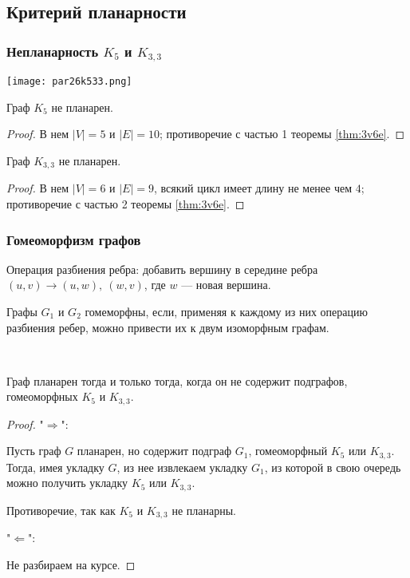 \subsection{Критерий планарности}

\subsubsection*{Непланарность $K_5$ и $K_{3,3}$}

\begin{center}
    \texttt{[image: par26k533.png]}
\end{center}

\begin{lemma}
    Граф $K_5$ не планарен.
\end{lemma}

\begin{proof}
    В нем $|V| = 5$ и $|E| = 10$; противоречие с частью 1 теоремы \ref*{thm:3v6e}.
\end{proof}

\begin{lemma}
    Граф $K_{3,3}$ не планарен.
\end{lemma}

\begin{proof}
    В нем $|V| = 6$ и $|E| = 9$, всякий цикл имеет длину не менее чем $4$; противоречие с частью 2 теоремы \ref*{thm:3v6e}.
\end{proof}

\subsubsection*{Гомеоморфизм графов}

\begin{defn}
    Операция разбиения ребра: добавить вершину в середине ребра $(u, v) \to (u, w),~(w, v)$, где $w$ --- новая вершина.

    Графы $G_1$ и $G_2$ гомеморфны, если, применяя к каждому из них операцию разбиения ребер, можно привести их к двум изоморфным графам.
\end{defn}

\begin{theorem}~
    
    Граф планарен тогда и только тогда, когда он не содержит подграфов, гомеоморфных $K_5$ и $K_{3,3}$.

\end{theorem}

\begin{proof}
    
    "$\Rightarrow$":

    Пусть граф $G$ планарен, но содержит подграф $G_1$, гомеоморфный $K_5$ или $K_{3, 3}$. Тогда, имея укладку $G$, из нее извлекаем укладку $G_1$, из которой в свою очередь можно получить укладку $K_5$ или $K_{3, 3}$.

    Противоречие, так как $K_5$ и $K_{3, 3}$ не планарны.

    "$\Leftarrow$":

    Не разбираем на курсе.

\end{proof}